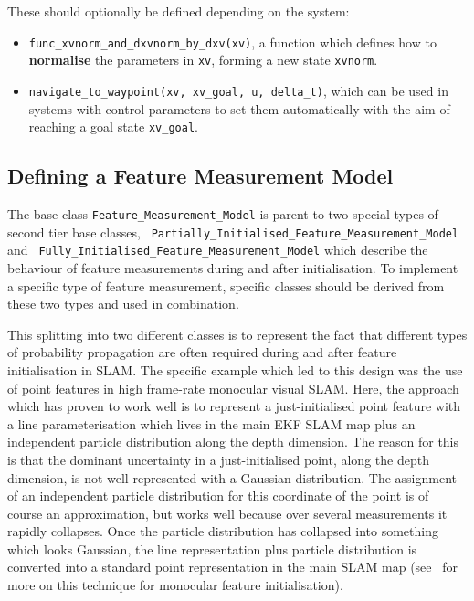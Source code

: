 \documentclass{article}
\begin{document}
These should optionally be defined depending on the system:

\begin{itemize}
\item {\tt func\_xvnorm\_and\_dxvnorm\_by\_dxv(xv)}, a function which
  defines how to {\bf normalise} the parameters in {\tt xv}, forming a
  new state {\tt xvnorm}.
\item {\tt navigate\_to\_waypoint(xv, xv\_goal, u, delta\_t)}, which
  can be used in systems with control parameters to set them
  automatically with the aim of reaching a goal state {\tt xv\_goal}.
\end{itemize}

\subsection{Defining a Feature Measurement Model}

The base class {\tt Feature\_Measurement\_Model} is parent to two
special types of second tier base classes, {\tt
  Partially\_Initialised\_Feature\_Measurement\_Model} and {\tt
  Fully\_Initialised\_Feature\_Measurement\_Model} which describe the
behaviour of feature measurements during and after initialisation. To
implement a specific type of feature measurement, specific classes
should be derived from these two types and used in combination.

This splitting into two different classes is to represent the fact
that different types of probability propagation are often required
during and after feature initialisation in SLAM. The specific example
which led to this design was the use of point features in high
frame-rate monocular visual SLAM. Here, the approach which has proven
to work well is to represent a just-initialised point feature with a
line parameterisation which lives in the main EKF SLAM map plus an
independent particle distribution along the depth dimension. The
reason for this is that the dominant uncertainty in a just-initialised
point, along the depth dimension, is not well-represented with a
Gaussian distribution. The assignment of an independent particle
distribution for this coordinate of the point is of course an
approximation, but works well because over several measurements it
rapidly collapses. Once the particle distribution has collapsed into
something which looks Gaussian, the line representation plus particle
distribution is converted into a standard point representation in the
main SLAM map (see~\cite{Davison:ICCV2003} for more on this technique
for monocular feature initialisation).
\end{document}

